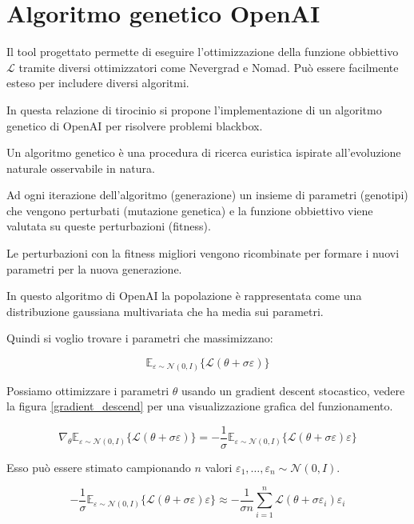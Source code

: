 \chapter{Algoritmo genetico OpenAI}

Il tool progettato permette di eseguire l'ottimizzazione della funzione obbiettivo $\mathcal{L}$
tramite diversi ottimizzatori come Nevergrad e Nomad. Può essere facilmente esteso per includere diversi
algoritmi.

In questa relazione di tirocinio si propone l'implementazione di un algoritmo genetico di OpenAI \cite{salimans2017es} per risolvere problemi
blackbox.

Un algoritmo genetico è una procedura di ricerca euristica ispirate all'evoluzione naturale osservabile in natura.

Ad ogni iterazione dell'algoritmo (generazione) un insieme di parametri (genotipi) che vengono perturbati (mutazione genetica) e la funzione obbiettivo
viene valutata su queste perturbazioni (fitness).

Le perturbazioni con la fitness migliori vengono ricombinate per formare i nuovi parametri per la nuova generazione.

In questo algoritmo di OpenAI la popolazione è rappresentata come una distribuzione gaussiana multivariata che ha media sui parametri.

Quindi si voglio trovare i parametri che  massimizzano:

\begin{equation}
    \mathbb{E}_{\varepsilon \sim \mathcal{N}(0,I)} \{ \mathcal{L}(\theta + \sigma \varepsilon) \}
\end{equation}

Possiamo ottimizzare i parametri $\theta$ usando un gradient descent stocastico, vedere la figura \ref{gradient_descend} per una visualizzazione grafica del funzionamento.

\begin{equation}
    \nabla_{\theta} \mathbb{E}_{\varepsilon \sim \mathcal{N}(0,I)} \{ \mathcal{L}(\theta + \sigma \varepsilon) \} = -\frac{1}{\sigma} \mathbb{E}_{\varepsilon \sim \mathcal{N}(0,I)} \{ \mathcal{L}(\theta + \sigma \varepsilon) \varepsilon \}
\end{equation}


Esso può essere stimato campionando $n$ valori $\varepsilon_1, \dots, \varepsilon_n \sim \mathcal{N}(0,I)$.

\begin{equation}
    -\frac{1}{\sigma} \mathbb{E}_{\varepsilon \sim \mathcal{N}(0,I)} \{ \mathcal{L}(\theta + \sigma \varepsilon) \varepsilon \} \approx -\frac{1}{\sigma n} \sum_{i=1}^n \mathcal{L}(\theta + \sigma \varepsilon_i) \varepsilon_i
\end{equation}

